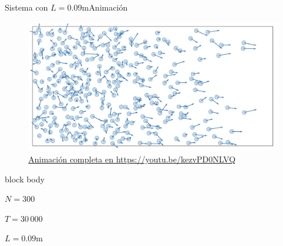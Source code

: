 \documentclass{beamer}
\begin{document}
\begin{frame}{Sistema con $L=0.09$m}{Animación}
    \begin{figure}[H!]
        \includegraphics[height=.50\textheight]{resources/animacion-L009.png}
        \caption*{\href{https://youtu.be/kezvPD0NLVQ}{Animación completa en https://youtu.be/kezvPD0NLVQ}}
    \end{figure}
    \begin{beamercolorbox}[sep=5pt,center]{block body}
        \begin{minipage}[t]{0.3\textwidth}
            \centering
            \small{$N=300$}
        \end{minipage}
        \hfill
        \begin{minipage}[t]{0.3\textwidth}
            \centering
            \small{$T=30\,000$}
        \end{minipage}
        \hfill
        \begin{minipage}[t]{0.3\textwidth}
            \centering
            \small{$L = 0.09$m}
        \end{minipage}
    \end{beamercolorbox}
\end{frame}
\end{document}
